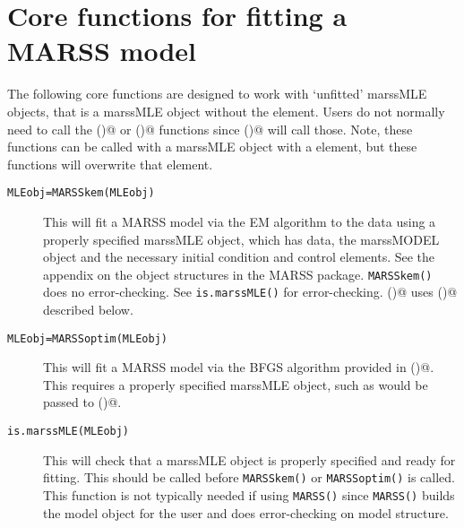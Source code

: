 \section{Core functions for fitting a MARSS model}
The following core functions are designed to work with `unfitted' marssMLE objects, that is a marssMLE object without the \verb@par@ element.  Users do not normally need to call the \verb@MARSSkem()@ or \verb@MARSSoptim()@ functions since \verb@MARSS()@ will call those. Note, these functions can be called with a marssMLE object with a \verb@par@ element, but these functions will overwrite that element.

\begin{description}
	\item[\texttt{MLEobj=MARSSkem(MLEobj)}] This will fit a MARSS model via the EM algorithm to the data using a properly specified marssMLE object, which has data, the marssMODEL object and the necessary initial condition and control elements.  See the appendix on the object structures in the MARSS package.  \texttt{MARSSkem()}	does no error-checking.  See \texttt{is.marssMLE()} for error-checking. \verb@MARSSkem()@ uses \verb@MARSSkf()@ described below.  
	\item[\texttt{MLEobj=MARSSoptim(MLEobj)}] This will fit a MARSS model via the BFGS algorithm provided in \verb@optim()@. This requires a properly specified marssMLE object, such as would be passed to \verb@MARSSkem()@. 
	\item[\texttt{is.marssMLE(MLEobj)}] This will check that a marssMLE object is properly specified and ready for fitting.  This should be called before \texttt{MARSSkem()} or \texttt{MARSSoptim()} is called.  This function is not typically needed if using \texttt{MARSS()} since \texttt{MARSS()} builds the model object for the user and does error-checking on model structure.
\end{description}

